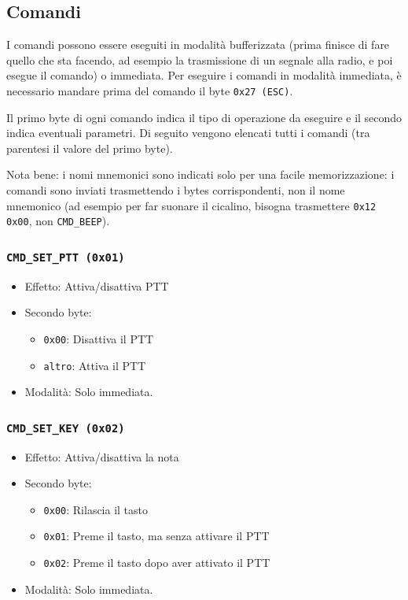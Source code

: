 \subsection{Comandi}\label{sec:cmds}
I comandi possono essere eseguiti in modalit\`a bufferizzata (prima finisce di fare quello che sta facendo, ad esempio la trasmissione di un segnale alla radio, e poi esegue il comando) o immediata.
Per eseguire i comandi in modalit\`a immediata, \`e necessario mandare prima del comando il byte \texttt{0x27 (ESC)}.


Il primo byte di ogni comando indica il tipo di operazione da eseguire e il secondo indica eventuali parametri.
Di seguito vengono elencati tutti i comandi (tra parentesi il valore del primo byte).

Nota bene: i nomi mnemonici sono indicati solo per una facile memorizzazione: i comandi sono inviati trasmettendo i bytes corrispondenti, non il nome mnemonico (ad esempio per far suonare il cicalino, bisogna trasmettere \texttt{0x12 0x00}, non \texttt{CMD\_BEEP}).

\subsubsection{\texttt{CMD\_SET\_PTT (0x01)}}
\begin{itemize}
	\item Effetto: Attiva/disattiva PTT
	\item Secondo byte:
	\begin{itemize}
		\item \texttt{0x00}: Disattiva il PTT
		\item \texttt{altro}: Attiva il PTT
	\end{itemize}
	\item Modalit\`a: Solo immediata.
\end{itemize}

\subsubsection{\texttt{CMD\_SET\_KEY (0x02)}}
\begin{itemize}
	\item Effetto: Attiva/disattiva la nota
	\item Secondo byte:
	\begin{itemize}
		\item \texttt{0x00}: Rilascia il tasto
		\item \texttt{0x01}: Preme il tasto, ma senza attivare il PTT
		\item \texttt{0x02}: Preme il tasto dopo aver attivato il PTT
	\end{itemize}
	\item Modalit\`a: Solo immediata.
\end{itemize}

